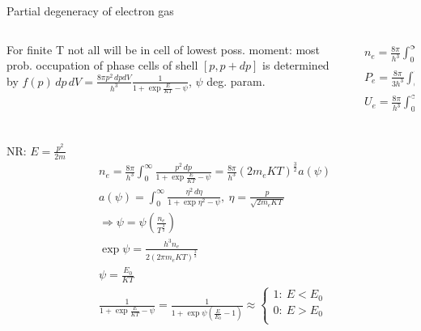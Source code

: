 \begin{frame}{Partial degeneracy of electron gas}
    \begin{columns}[T]
        \begin{column}{0.65\textwidth}
    For finite T not all \Pelectron will be in cell of lowest poss. moment: most prob. occupation of phase cells of shell $[p,p+dp]$ is determined by $f(p)\,dp\,dV=\frac{8\pi p^2\,dpdV}{h^3}\frac{1}{1+\exp{\frac{E}{KT}-\psi}}$, $\psi$ deg. param.
        \end{column}
        \begin{column}{0.35\textwidth}
            \begin{align*}
                &n_e=\frac{8\pi}{h^3}\int_0^{\infty}\frac{p^2\,dp}{1+\exp{\frac{E}{KT}-\psi}}\\
                &P_e=\frac{8\pi}{3h^3}\int_0^{\infty}p^3v(p)\frac{p^2\,dp}{1+\exp{\frac{E}{KT}-\psi}}\\
                &U_e=\frac{8\pi}{h^3}\int_0^{\infty}\frac{Ep^2\,dp}{1+\exp{\frac{E}{KT}-\psi}}\\
            \end{align*}
        \end{column}
    \end{columns}
    \begin{columns}[T]
        \begin{column}{0.55\textwidth}
            NR: $E=\frac{p^2}{2m}$
            \begin{align*}
                &n_e=\frac{8\pi}{h^3}\int_0^{\infty}\frac{p^2\,dp}{1+\exp{\frac{E}{KT}-\psi}}=\frac{8\pi}{h^3}(2m_eKT)^{\frac{3}{2}}a(\psi)\\
                &a(\psi)=\int_0^{\infty}\frac{\eta^2\,d\eta}{1+\exp{\eta^2-\psi}},\ \eta=\frac{p}{\sqrt{2m_eKT}}\\
                &\Rightarrow \psi=\psi(\frac{n_e}{T^{\frac{3}{2}}})\\
                &\exp{\psi}=\frac{h^3n_e}{2(2\pi m_eKT)^{\frac{3}{2}}}\tag{$\psi\to-\infty$, large T, $f(p)$ becomes Boltzman}\\
                &\psi=\frac{E_0}{KT}\tag{$\psi\to\infty$}\\
                &\frac{1}{1+\exp{\frac{E}{KT}-\psi}}=\frac{1}{1+\exp{\psi(\frac{E}{E_0}-1)}}\approx\left\{\begin{array}{l}
                        1:\ E<E_0\\
                        0:\ E>E_0\\
                    \end{array}\\

\end{align*}
\end{column}
\end{columns}
\end{frame}
